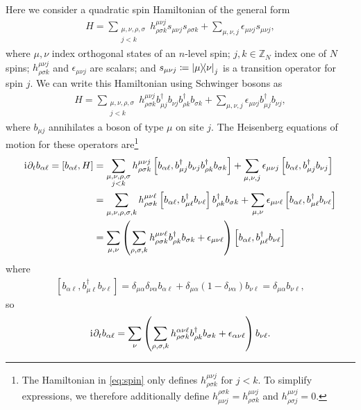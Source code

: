 \documentclass[nofootinbib,notitlepage,11pt]{revtex4-2}
\newcommand{\p}[1]{\left(#1\right)} %
\renewcommand{\sp}[1]{\left[#1\right]} %
\renewcommand{\d}{\partial} %
\renewcommand{\i}{\mathrm{i}\mkern1mu} %
\newcommand{\1}{\mathds{1}}
\newcommand{\ZZ}{\mathbb{Z}}
\begin{document}
Here we consider a quadratic spin Hamiltonian of the general form
\begin{align}
  H = \sum_{\substack{\mu,\nu,\rho,\sigma\\j<k}}
  h^{\mu\nu j}_{\rho\sigma k} s_{\mu\nu j} s_{\rho\sigma k}
  + \sum_{\mu,\nu,j} \epsilon_{\mu\nu j} s_{\mu\nu j},
  \label{eq:spin}
\end{align}
where $\mu,\nu$ index orthogonal states of an $n$-level spin; $j,k\in\ZZ_N$ index one of $N$ spins; $h^{\mu\nu j}_{\rho\sigma k}$ and $\epsilon_{\mu\nu j}$ are scalars; and $s_{\mu\nu j}\coloneqq\op{\mu}{\nu}_j$ is a transition operator for spin $j$.  We can write this Hamiltonian using Schwinger bosons as
\begin{align}
  H = \sum_{\substack{\mu,\nu,\rho,\sigma\\j<k}}
  h^{\mu\nu j}_{\rho\sigma k}
  b_{\mu j}^\dag b_{\nu j} b_{\rho k}^\dag b_{\sigma k}
  + \sum_{\mu,\nu,j} \epsilon_{\mu\nu j} b_{\mu j}^\dag b_{\nu j},
\end{align}
where $b_{\mu j}$ annihilates a boson of type $\mu$ on site $j$.
The Heisenberg equations of motion for these operators are\footnote{The Hamiltonian in \eqref{eq:spin} only defines $h^{\mu\nu j}_{\rho\sigma k}$ for $j<k$.
  To simplify expressions, we therefore additionally define $h^{\rho\sigma k}_{\mu\nu j}=h^{\mu\nu j}_{\rho\sigma k}$ and $h^{\mu\nu j}_{\rho\sigma j}=0$.}
\begin{align}
  \i \d_t b_{\alpha\ell} = \sp{b_{\alpha\ell}, H}
  &= \sum_{\substack{\mu,\nu,\rho,\sigma\\j<k}}
  h^{\mu\nu j}_{\rho\sigma k}
  \sp{b_{\alpha\ell}, b_{\mu j}^\dag b_{\nu j} b_{\rho k}^\dag b_{\sigma k}}
  + \sum_{\mu,\nu,j} \epsilon_{\mu\nu j}
  \sp{b_{\alpha\ell}, b_{\mu j}^\dag b_{\nu j}} \\
  &= \sum_{\mu,\nu,\rho,\sigma,k} h^{\mu\nu\ell}_{\rho\sigma k}
  \sp{b_{\alpha\ell}, b_{\mu\ell}^\dag b_{\nu\ell}}
  b_{\rho k}^\dag b_{\sigma k}
  + \sum_{\mu,\nu} \epsilon_{\mu\nu\ell}
  \sp{b_{\alpha\ell}, b_{\mu\ell}^\dag b_{\nu\ell}} \\
  &= \sum_{\mu,\nu} \p{\sum_{\rho,\sigma,k}
    h^{\mu\nu\ell}_{\rho\sigma k} b_{\rho k}^\dag b_{\sigma k}
    + \epsilon_{\mu\nu\ell}}
  \sp{b_{\alpha\ell}, b_{\mu\ell}^\dag b_{\nu\ell}}
\end{align}
where
\begin{align}
  \sp{b_{\alpha\ell}, b_{\mu\ell}^\dag b_{\nu\ell}}
  = \delta_{\mu\alpha} \delta_{\nu\alpha} b_{\alpha\ell}
  + \delta_{\mu\alpha} \p{1-\delta_{\nu\alpha}} b_{\nu\ell}
  = \delta_{\mu\alpha} b_{\nu\ell},
\end{align}
so
\begin{align}
  \i \d_t b_{\alpha\ell}
  = \sum_\nu \p{\sum_{\rho,\sigma,k}
    h^{\alpha\nu\ell}_{\rho\sigma k} b_{\rho k}^\dag b_{\sigma k}
    + \epsilon_{\alpha\nu\ell}} b_{\nu\ell}.
\end{align}
\end{document}
